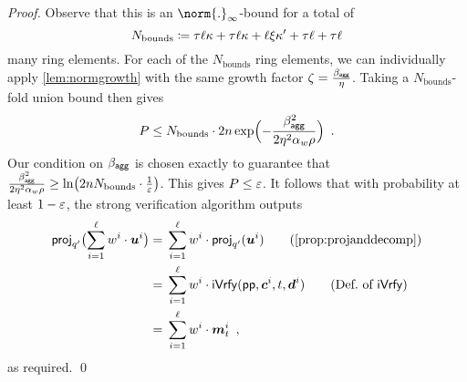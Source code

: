 \begin{proof}
Observe that this is an $\norm{.}_\infty$-bound for a total of
\[
  N_\textrm{bounds} \coloneqq \tau\ell \kappa + \tau\ell\kappa + \ell\xi\kappa' + \tau\ell + \tau\ell
\]
many ring elements.
For each of the $N_\textrm{bounds}$ ring elements, we can individually apply \autoref{lem:normgrowth} with the same growth factor $\zeta =\tfrac{\beta_{\mathsf{agg}}}{\eta}$.
Taking a $N_\textrm{bounds}$-fold union bound then gives
\[
 P \leq N_{\textrm{bounds}}\cdot 2n\exp\Bigl(-\frac{\beta_{\mathsf{agg}}^2}{2\eta^2\alpha_w\rho}\Bigr)\enspace.
\]
Our condition on $\beta_{\mathsf{agg}}$ is chosen exactly to guarantee that $\tfrac{\beta_{\mathsf{agg}}^2}{2\eta^2\alpha_w\rho} \geq \ln\bigl(2nN_{\textrm{bounds}}\cdot \tfrac{1}{\varepsilon} \bigr)$.
This gives $P\leq \varepsilon$.
It follows that with probability at least $1-\varepsilon$, the strong verification algorithm outputs
  \begin{align*}
    \projmod{q'}\bigl(\sum_{i=1}^{\ell}w^i \cdot \vec{u}^i\bigr)
    ={}&\sum_{i=1}^{\ell}w^i \cdot \projmod{q'}(\vec{u}^i) \tag{\autoref{prop:projanddecomp}}\\
    ={}&\sum_{i=1}^{\ell}w^i \cdot \iverify(\params,\vec{c}^i,t,\vec{d}^i)\tag{Def.\ of $\iverify$}\\
    ={}&\sum_{i=1}^{\ell}w^i \cdot \vec{m}_t^i\enspace,
  \end{align*}
  as required.%
  \qed
 

\end{proof}
